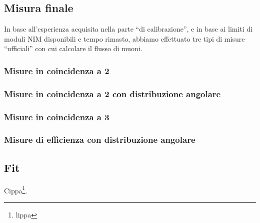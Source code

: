 \subsection{Misura finale}

In base all'esperienza acquisita nella parte ``di calibrazione'',
e in base ai limiti di moduli NIM disponibili e tempo rimasto,
abbiamo effettuato tre tipi di misure ``ufficiali'' con cui calcolare il flusso di muoni.

\subsubsection{Misure in coincidenza a 2}

\subsubsection{Misure in coincidenza a 2 con distribuzione angolare}

\subsubsection{Misure in coincidenza a 3}

\subsubsection{Misure di efficienza con distribuzione angolare}

\subsection{Fit}

Cippa\footnote{lippa}.
